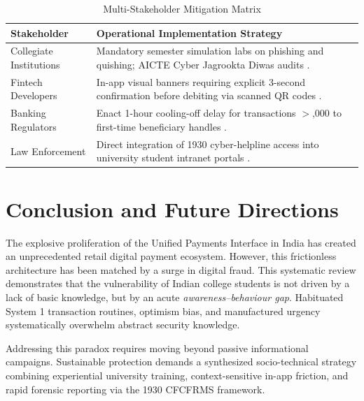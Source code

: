 \documentclass[journal,10pt,twocolumn]{IEEEtran}
\begin{document}
\begin{table}[htbp]
\caption{Multi-Stakeholder Mitigation Matrix}
\label{tab:mitigation}
\centering
\begin{tabularx}{\columnwidth}{lX}
\toprule
\textbf{Stakeholder} & \textbf{Operational Implementation Strategy} \\
\midrule
Collegiate Institutions & Mandatory semester simulation labs on phishing and quishing; AICTE Cyber Jagrookta Diwas audits \cite{aicte2022}. \\
Fintech Developers & In-app visual banners requiring explicit 3-second confirmation before debiting via scanned QR codes \cite{newsonair2026}. \\
Banking Regulators & Enact 1-hour cooling-off delay for transactions $>$\textyen 10,000 to first-time beneficiary handles \cite{newsonair2026}. \\
Law Enforcement & Direct integration of 1930 cyber-helpline access into university student intranet portals \cite{pib_helpline2023, pib_curbing2026}. \\
\bottomrule
\end{tabularx}
\end{table}

\section{Conclusion and Future Directions}
The explosive proliferation of the Unified Payments Interface in India has created an unprecedented retail digital payment ecosystem. However, this frictionless architecture has been matched by a surge in digital fraud. This systematic review demonstrates that the vulnerability of Indian college students is not driven by a lack of basic knowledge, but by an acute \textit{awareness--behaviour gap}. Habituated System 1 transaction routines, optimism bias, and manufactured urgency systematically overwhelm abstract security knowledge.

Addressing this paradox requires moving beyond passive informational campaigns. Sustainable protection demands a synthesized socio-technical strategy combining experiential university training, context-sensitive in-app friction, and rapid forensic reporting via the 1930 CFCFRMS framework.
\end{document}
